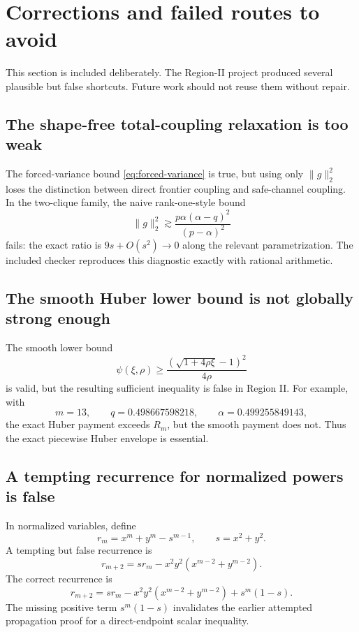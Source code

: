 \documentclass[11pt]{article}
\begin{document}
\section{Corrections and failed routes to avoid}

This section is included deliberately.  The Region-II project produced
several plausible but false shortcuts.  Future work should not reuse them
without repair.

\subsection{The shape-free total-coupling relaxation is too weak}

The forced-variance bound \eqref{eq:forced-variance} is true, but using
only $\|g\|_2^2$ loses the distinction between direct frontier coupling and
safe-channel coupling.  In the two-clique family, the naive rank-one-style
bound
\[
        \|g\|_2^2
        \gtrsim
        \frac{p\alpha(\alpha-q)^2}{(p-
        \alpha)^2}
\]
fails: the exact ratio is $9s+O(s^2)\to0$ along the relevant
parametrization.  The included checker reproduces this diagnostic exactly
with rational arithmetic.

\subsection{The smooth Huber lower bound is not globally strong enough}

The smooth lower bound
\[
        \psi(\xi,\rho)\ge
        \frac{(\sqrt{1+4\rho\xi}-1)^2}{4\rho}
\]
is valid, but the resulting sufficient inequality is false in Region II.
For example, with
\[
        m=13,
        \qquad q=0.498667598218,
        \qquad \alpha=0.499255849143,
\]
the exact Huber payment exceeds $R_m$, but the smooth payment does not.
Thus the exact piecewise Huber envelope is essential.

\subsection{A tempting recurrence for normalized powers is false}

In normalized variables, define
\[
        r_m=x^m+y^m-s^{m-1},
        \qquad s=x^2+y^2.
\]
A tempting but false recurrence is
\[
        r_{m+2}=sr_m-x^2y^2(x^{m-2}+y^{m-2}).
\]
The correct recurrence is
\begin{equation}\label{eq:correct-recurrence}
        r_{m+2}=sr_m-x^2y^2(x^{m-2}+y^{m-2})+s^m(1-s).
\end{equation}
The missing positive term $s^m(1-s)$ invalidates the earlier attempted
propagation proof for a direct-endpoint scalar inequality.
\end{document}
